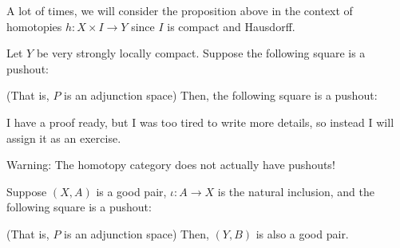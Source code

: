 \documentclass[12pt,reqno]{amsart}
\numberwithin{theorem}{section}
\theoremstyle{definition}
\theoremstyle{remark}
\numberwithin{equation}{section}
\theoremstyle{definition}
\newcommand{\id}{\mathrm{id}}
\begin{document}
A lot of times, we will consider the proposition above in the context of homotopies $h:X\times I \rightarrow Y$ since $I$ is compact and Hausdorff.
\begin{corollary}\label{corollary}
    Let $Y$ be very strongly locally compact. Suppose the following square is a pushout:
    \begin{center}
    \end{center}
    (That is, $P$ is an adjunction space) Then, the following square is a pushout:
    \begin{center}
    \end{center}
\end{corollary}
I have a proof ready, but I was too tired to write more details, so instead I will assign it as an exercise.
\begin{remark}
Warning: The homotopy category does not actually have pushouts!
\end{remark}
\begin{corollary}
    Suppose $(X,A)$ is a good pair, $\iota:A\rightarrow X$ is the natural inclusion, and the following square is a pushout:
    \begin{center}
    \end{center}
    (That is, $P$ is an adjunction space) Then, $(Y,B)$ is also a good pair.
\end{corollary}
\end{document}
